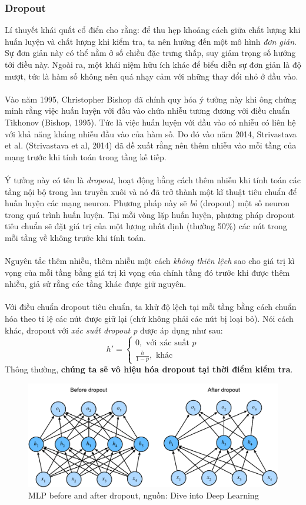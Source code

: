 \documentclass{article}
\begin{document}
 \subsubsection{Dropout}
 Lí thuyết khái quất cổ điển cho rằng: để thu hẹp khoảng cách giữa chất lượng khi huấn luyện và chất lượng khi kiểm tra, ta nên hướng đến một mô hình \textit{đơn giản}. Sự đơn giản này có thể nằm ở số chiều đặc trưng thấp, suy giảm trọng số hướng tới điều này. Ngoài ra, một khái niệm hữu ích khác để biểu diễn sự đơn giản là độ mượt, tức là hàm số không nên quá nhạy cảm với những thay đổi nhỏ ở đầu vào.\\\\
 Vào năm 1995, Christopher Bishop đã chính quy hóa ý tưởng này khi ông chứng minh rằng việc huấn luyện với đầu vào chứa nhiễu tương đương với điều chuẩn Tikhonov (Bishop, 1995). Tức là việc huấn luyện với đầu vào có nhiễu có liên hệ với khả năng kháng nhiễu đầu vào của hàm số. Do đó vào năm 2014, Strivastava et al. (Strivastava et al, 2014) đã đề xuất rằng nên thêm nhiễu vào mỗi tầng của mạng trước khi tính toán trong tầng kế tiếp.\\\\
 Ý tưởng này có tên là \textit{dropout}, hoạt động bằng cách thêm nhiễu khi tính toán các tầng nội bộ trong lan truyền xuôi và nó đã trở thành một kĩ thuật tiêu chuẩn để huấn luyện các mạng neuron. Phương pháp này sẽ \textit{bỏ} (dropout) một số neuron trong quá trình huấn luyện. Tại mỗi vòng lặp huấn luyện, phương pháp dropout tiêu chuẩn sẽ đặt giá trị của một lượng nhất định (thường 50\%) các nút trong mỗi tầng về không trước khi tính toán.\\\\
 Nguyên tắc thêm nhiễu, thêm nhiễu một cách \textit{không thiên lệch} sao cho giá trị kì vọng của mỗi tầng bằng giá trị kì vọng của chính tầng đó trước khi được thêm nhiễu, giả sử rằng các tầng khác được giữ nguyên. \\\\
 Với điều chuẩn dropout tiêu chuẩn, ta khử độ lệch tại mỗi tầng bằng cách chuẩn hóa theo tỉ lệ các nút được giữ lại (chứ không phải các nút bị loại bỏ). Nói cách khác, dropout với \textit{xác suất dropout p} được áp dụng như sau:
 \begin{equation}
     h' = \begin{cases}
         0, \text{ với xác suất $p$} \\
         \frac{h}{1-p}, \text{ khác}
    \label{eq50}
     \end{cases}
 \end{equation}
 Thông thường, \textbf{chúng ta sẽ vô hiệu hóa dropout tại thời điểm kiểm tra}.
 \begin{figure}[ht!]
     \centering
     \includegraphics[width = 0.6\linewidth]{dropout2.pdf}
     \caption{MLP before and after dropout, nguồn: Dive into Deep Learning}
     \label{fig21}
 \end{figure}
\end{document}
